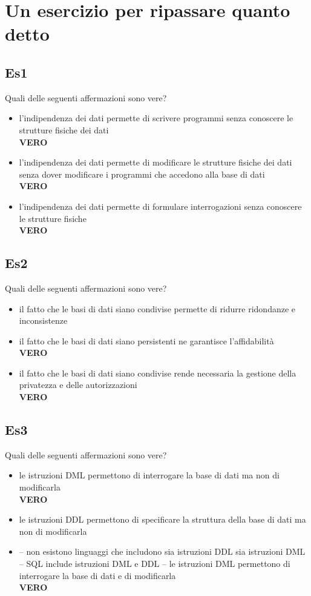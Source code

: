 \section{Un esercizio per ripassare quanto detto}
\subsection{Es1}
Quali delle seguenti affermazioni sono vere?
\begin{itemize}
    \item l'indipendenza dei dati permette di scrivere programmi senza conoscere le strutture fisiche dei dati
    \\\textbf{VERO}
    \item l'indipendenza dei dati permette di modificare le strutture fisiche dei dati senza dover modificare i programmi che accedono alla base di dati
    \\\textbf{VERO}
    \item l'indipendenza dei dati permette di formulare interrogazioni senza conoscere le strutture fisiche
    \\\textbf{VERO}
\end{itemize}

\subsection{Es2}
Quali delle seguenti affermazioni sono vere?
\begin{itemize}
    \item il fatto che le basi di dati siano condivise
    permette di ridurre ridondanze e inconsistenze
    \item il fatto che le basi di dati siano persistenti ne
    garantisce l'affidabilità
    \\\textbf{VERO}
    \item il fatto che le basi di dati siano condivise rende
    necessaria la gestione della privatezza e delle
    autorizzazioni
    \\\textbf{VERO}
\end{itemize}

\subsection{Es3}
Quali delle seguenti affermazioni sono vere?
\begin{itemize}
    \item le istruzioni DML permettono di interrogare la base di dati ma non di modificarla
    \\\textbf{VERO}
    \item le istruzioni DDL permettono di specificare la struttura della base di dati ma non di modificarla
    \item 
    – non esistono linguaggi che includono sia istruzioni
    DDL sia istruzioni DML
    – SQL include istruzioni DML e DDL
    – le istruzioni DML permettono di interrogare la base
    di dati e di modificarla
    \\\textbf{VERO}
\end{itemize}

